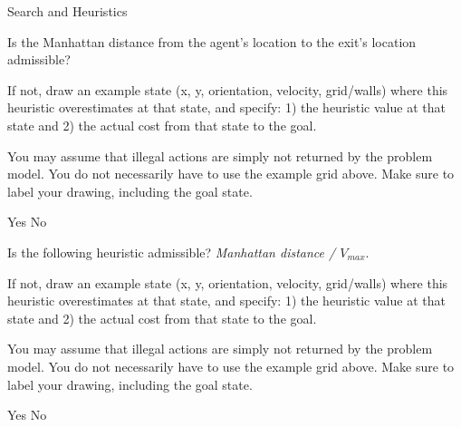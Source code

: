 \begin{problem} {Search and Heuristics}
\begin{question}[4]


\end{question}
 
\begin{question}[4]
Is the Manhattan distance from the agent’s location to the exit’s location admissible?

If not, draw an example state (x, y, orientation, velocity, grid/walls) where this heuristic overestimates at that state, and specify: 1) the heuristic value at that state and 2) the actual cost from that state to the goal.

You may assume that illegal actions are simply not returned by the problem model. You do not necessarily have to use the example grid above. Make sure to label your drawing, including the goal state.

\hspace{5mm}
\solution{\emptycircle}{\OnedYes} Yes
\hspace{5mm}
\solution{\emptycircle}{\OnedNo} No


\end{question}

\newpage
 
\begin{question}[4]
Is the following heuristic admissible? \textit{Manhattan distance / $V_{max}$}.

If not, draw an example state (x, y, orientation, velocity, grid/walls) where this heuristic overestimates at that state, and specify: 1) the heuristic value at that state and 2) the actual cost from that state to the goal.

You may assume that illegal actions are simply not returned by the problem model. You do not necessarily have to use the example grid above. Make sure to label your drawing, including the goal state.

\hspace{5mm}
\solution{\emptycircle}{\OneeYes} Yes
\hspace{5mm}
\solution{\emptycircle}{\OneeNo} No

\end{question}


\end{problem}

